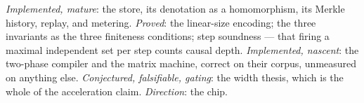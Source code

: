 \begin{remark}
\label{pr:rmk:claims}
\emph{Implemented, mature}: the store, its denotation as a homomorphism, its Merkle history,
replay, and metering. \emph{Proved}: the linear-size encoding; the three invariants as the
three finiteness conditions; step soundness --- that firing a maximal independent set per
step counts causal depth. \emph{Implemented, nascent}: the two-phase compiler and the
matrix machine, correct on their corpus, unmeasured on anything else. \emph{Conjectured,
falsifiable, gating}: the width thesis, which is the whole of the acceleration claim.
\emph{Direction}: the chip.
\end{remark}

